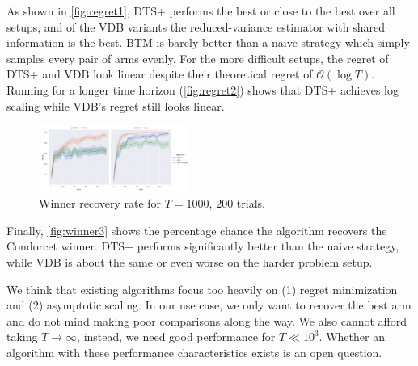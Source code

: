 \documentclass[10pt,twocolumn,letterpaper]{article}
\begin{document}
As shown in \autoref{fig:regret1}, DTS+ performs the best or
close to the best over all setups, and of the VDB variants the
reduced-variance estimator with shared information is the best.
BTM is barely better than a naive strategy
which simply samples every pair of arms evenly.
For the more difficult setups, the regret of DTS+ and VDB look linear
despite their theoretical regret of \( \mathcal{O}(\log T) \).
Running for a longer time horizon (\autoref{fig:regret2}) shows that
DTS+ achieves log scaling while VDB's regret still looks linear.

\begin{figure}[h!]
  \centering
  \includegraphics[width=0.44\textwidth]{figures/winner_3.png}
  \caption{%
    Winner recovery rate for \( T = 1000 \), \( 200 \) trials.
  }
  \label{fig:winner3}
\end{figure}

Finally, \autoref{fig:winner3} shows the percentage
chance the algorithm recovers the Condorcet winner.
DTS+ performs significantly better than the naive strategy, while
VDB is about the same or even worse on the harder problem setup.

We think that existing algorithms focus too heavily on
(1) regret minimization and (2) asymptotic scaling.
In our use case, we only want to recover the best arm
and do not mind making poor comparisons along the way.
We also cannot afford taking \( T \to \infty \),
instead, we need good performance for \( T \ll 10^3 \).
Whether an algorithm with these performance
characteristics exists is an open question.
\end{document}
